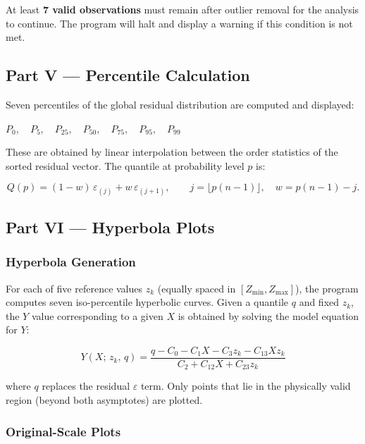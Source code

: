 \documentclass[12pt,a4paper]{article}
\begin{document}
\begin{warnbox}
    At least \textbf{7 valid observations} must remain after outlier removal for the
    analysis to continue.  The program will halt and display a warning if this
    condition is not met.
\end{warnbox}

\subsection{Part V --- Percentile Calculation}

Seven percentiles of the global residual distribution are computed and displayed:

\begin{center}
$P_0,\quad P_5,\quad P_{25},\quad P_{50},\quad P_{75},\quad P_{95},\quad P_{99}$
\end{center}

These are obtained by linear interpolation between the order statistics of the
sorted residual vector.  The quantile at probability level $p$ is:

\[
    Q(p) = (1-w)\,\varepsilon_{(j)} + w\,\varepsilon_{(j+1)},
    \qquad j = \lfloor p(n-1) \rfloor,\quad w = p(n-1) - j.
\]

\subsection{Part VI --- Hyperbola Plots}

\subsubsection{Hyperbola Generation}

For each of five reference values $z_k$ (equally spaced in $[Z_\min, Z_\max]$),
the program computes seven iso-percentile hyperbolic curves.  Given a quantile
$q$ and fixed $z_k$, the $Y$ value corresponding to a given $X$ is obtained
by solving the model equation for $Y$:

\[
    Y(X;\, z_k,\, q) = \frac{q - C_0 - C_1 X - C_3 z_k - C_{13} X z_k}
                            {C_2 + C_{12} X + C_{23} z_k}
\]

where $q$ replaces the residual $\varepsilon$ term.  Only points that lie in the
physically valid region (beyond both asymptotes) are plotted.

\subsubsection{Original-Scale Plots}
\end{document}
